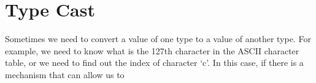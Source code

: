 \documentclass[../main.tex]{subfiles}
\begin{document}
    \section{Type Cast}
    Sometimes we need to convert a value of one type to a value of another type.
    For example, we need to know what is the 127th character in the ASCII character
    table, or we need to find out the index of character `c'. In this case, if 
    there is a mechanism that can allow us to 
\end{document}
